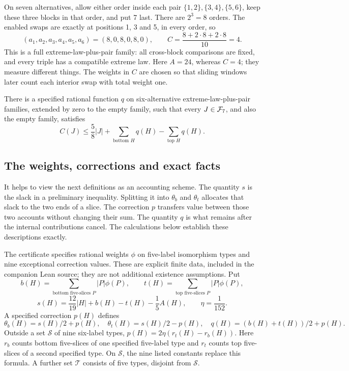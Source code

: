 \begin{example}
On seven alternatives, allow either order inside each pair
\(\{1,2\},\{3,4\},\{5,6\}\), keep these three blocks in that
order, and put 7 last. There are \(2^3=8\) orders. The enabled swaps
are exactly at positions 1, 3 and 5, in every order, so
\[
 (a_1,a_2,a_3,a_4,a_5,a_6)=(8,0,8,0,8,0),\qquad
 C=\frac{8+2\cdot8+2\cdot8}{10}=4.
\]
This is a full extreme-law-plus-pair family: all cross-block comparisons
are fixed, and every triple has a compatible extreme law. Here
\(A=24\), whereas \(C=4\); they measure different things.
The weights in \(C\) are chosen so that sliding windows later count
each interior swap with total weight one.
\end{example}

\begin{theorem}\label{thm:finite}
There is a specified rational function \(q\) on six-alternative
extreme-law-plus-pair families, extended by zero to the empty family,
such that every \(J\in\mathcal F_7\), and also the empty family, satisfies
\[
 \boxed{C(J)\leq\frac58|J|+
       \sum_{\text{bottom }H}q(H)-\sum_{\text{top }H}q(H).}
\]
\end{theorem}

\subsection{The weights, corrections and exact facts}
It helps to view the next definitions as an accounting scheme.
The quantity \(s\) is the slack in a preliminary inequality. Splitting
it into \(\theta_b\) and \(\theta_t\) allocates that slack to the two
ends of a slice. The correction \(p\) transfers value between those
two accounts without changing their sum. The quantity \(q\) is what
remains after the internal contributions cancel. The calculations
below establish these descriptions exactly.

The certificate specifies rational weights \(\phi\) on five-label
isomorphism types and nine exceptional correction values. These are
explicit finite data, included in the companion Lean source; they
are not additional existence assumptions. Put
\[
 b(H)=\sum_{\text{bottom five-slices }P}|P|\phi(P),\qquad
 t(H)=\sum_{\text{top five-slices }P}|P|\phi(P),
\]
\[
 s(H)=\frac{12}{19}|H|+b(H)-t(H)-\frac15A(H),\qquad
 \eta=\frac1{152}.
\]
A specified correction \(p(H)\) defines
\[
 \theta_b(H)=s(H)/2+p(H),\quad
 \theta_t(H)=s(H)/2-p(H),\quad q(H)=(b(H)+t(H))/2+p(H).
\]
Outside a set \(\mathcal S\) of nine six-label types,
\(p(H)=2\eta(r_t(H)-r_b(H))\). Here \(r_b\) counts bottom
five-slices of one specified five-label type and \(r_t\) counts
top five-slices of a second specified type. On \(\mathcal S\), the
nine listed constants replace this formula. A further set
\(\mathcal T\) consists of five types, disjoint from \(\mathcal S\).

